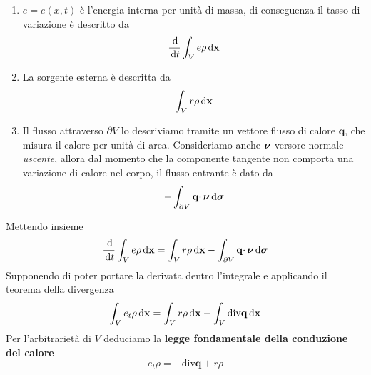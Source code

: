 \begin{enumerate}
    \item $e=e(x,t)$ è l'energia interna per unità di massa, di conseguenza il tasso di variazione è descritto da
          \begin{equation*}
              \frac{\,\mathrm d}{\,\mathrm d t}\int _{V} e\rho \,\mathrm d \mathbf{x}
          \end{equation*}
    \item La sorgente esterna è descritta da
          \begin{equation*}
              \int _{V} r\rho \,\mathrm d \mathbf{x}
          \end{equation*}
    \item Il flusso attraverso $\partial V$ lo descriviamo tramite un vettore flusso di calore $\mathbf{q}$, che misura il calore per unità di area. Consideriamo anche $\displaystyle \bm{\nu}$ versore normale \emph{uscente}, allora dal momento che la componente tangente non comporta una variazione di calore nel corpo, il flusso entrante è dato da
          \begin{equation*}
              -\int _{\partial V}\mathbf{q} \cdotp \bm{\nu} \,\mathrm d \bm{\sigma}
          \end{equation*}
\end{enumerate}

Mettendo insieme
\begin{equation*}
    \frac{\,\mathrm d}{\,\mathrm d t}\int _{V} e\rho \,\mathrm d \mathbf{x}=\int _{V} r\rho \,\mathrm d \mathbf{x}-\int _{\partial V}\mathbf{q} \cdotp \bm{\nu} \,\mathrm d \bm{\sigma}
\end{equation*}
Supponendo di poter portare la derivata dentro l'integrale e applicando il teorema della divergenza
\begin{equation*}
    \int _{V} e_{t} \rho \,\mathrm d \mathbf{x}=\int _{V} r\rho \,\mathrm d \mathbf{x}-\int _{V}\mathrm{div}\mathbf{q} \,\mathrm d \mathbf{x}
\end{equation*}
Per l'arbitrarietà di $V$ deduciamo la \textbf{legge fondamentale della conduzione del calore}
\begin{equation*}
    \boxed{e_{t} \rho =-\mathrm{div}\mathbf{q} +r\rho }
\end{equation*}


